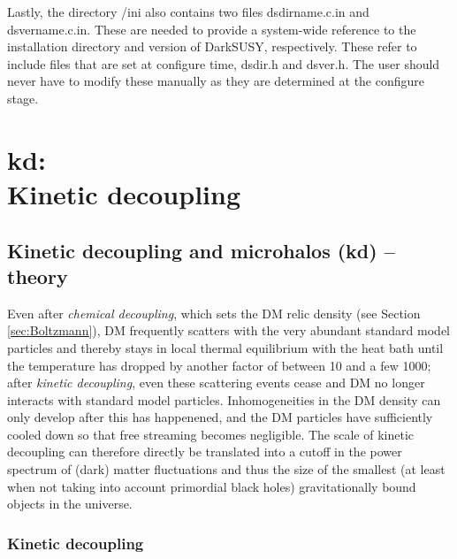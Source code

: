 \documentclass[a4paper,10pt,oneside]{book}
\newcommand{\code}[1]{\ft{#1}}
\newcommand{\codeb}[1]{\ftb{#1}}
\newcommand{\ds}{{\sffamily DarkSUSY}}
\newcommand{\ft}[1]{\textsf{#1}}
\newcommand{\ftb}[1]{{\bfseries \sffamily #1}}
\begin{document}
Lastly, the directory \code{/ini} also contains two files \code{dsdirname.c.in} and \code{dsvername.c.in}.
These are needed to provide a system-wide reference to the installation directory and version of
\ds, respectively. These refer to include files that are set at configure time, \code{dsdir.h} and \code{dsver.h}. The user should never have to modify these manually as they are determined at the configure stage.



\chapter[kd: Kinetic decoupling]{\codeb{kd}:\\ Kinetic decoupling}
\label{ch:src/kd}

\section{Kinetic decoupling and microhalos (kd) -- theory}
\label{sec:kd}


Even after \emph{chemical decoupling}, which sets the DM relic density (see Section 
\ref{sec:Boltzmann}), DM  frequently scatters with the very abundant 
standard model particles and thereby stays in local thermal equilibrium with the 
heat bath until the temperature has dropped by another factor of between 10 and
 a few 1000; after \emph{kinetic decoupling}, even these scattering events cease and DM 
no longer interacts with standard model particles. Inhomogeneities 
in the DM density can only develop after this has happenened, and the DM particles have
sufficiently cooled down so that free streaming becomes negligible.
The scale of kinetic decoupling can therefore directly be translated 
into a cutoff in the power spectrum of (dark) matter fluctuations and thus the size of the 
smallest (at least when not taking into account primordial black holes) gravitationally 
bound objects in the universe.



\subsection{Kinetic decoupling}
\end{document}
